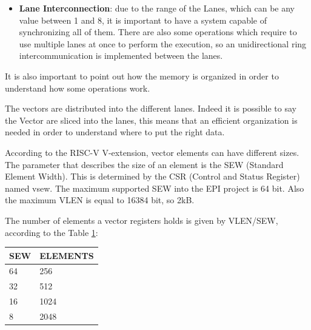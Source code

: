 \begin{itemize}
    This solution implies the existence of some cost in terms of latency, due to the starting of a new instruction.
    Inside the Vector Lane the Write-Back Buffer (WB) and the Load Buffer (LB) are important as well. Those buffers store the data until the VRF line is complete.
    There is also the Store Buffer (SB) which holds the data read from the register file and then sends it to the Store Unit. 
    Eventually when an instruction is completed the physical register are freed. 
    
    The VPU can be configured with different numbers of lanes from 1 up to 8, the default value is 8.
    
    \item \textbf{Lane Interconnection}: due to the range of the Lanes, which can be any value between 1 and 8, it is important to have a system capable of synchronizing all of them. There are also some operations which require to use multiple lanes at once to perform the execution, so an unidirectional ring intercommunication is implemented between the lanes.
\end{itemize}

It is also important to point out how the memory is organized in order to understand how some operations work.

The vectors are distributed into the different lanes. Indeed it is possible to say the Vector are sliced into the lanes, this means that an efficient organization is needed in order to understand where to put the right data.


According to the RISC-V V-extension, vector elements can have different sizes. The parameter that describes the size of an element is the SEW (Standard Element Width). This is determined by the CSR (Control and Status Register) named vsew. The maximum supported SEW into the EPI project is 64 bit. Also the maximum VLEN is equal to 16384 bit, so 2kB.

The number of elements a vector registers holds is given by VLEN/SEW, according to the Table \ref{sew-el}:


\begin{table}[H]
    \centering
    \begin{tabular}{|l|l|}
    \hline
        \rowcolor[HTML]{C0C0C0} 
        SEW & ELEMENTS \\ \hline
        64  & 256      \\ \hline
        32  & 512      \\ \hline
        16  & 1024     \\ \hline
        8   & 2048     \\ \hline
    \end{tabular}
    \label{sew-el}
\end{table}

